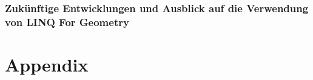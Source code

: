\documentclass[pagesize, paper=a4, fontsize=12pt,titlepage=true, headings=small, headnosepline, abstractoff, liststotoc, nochapterprefix, plainheadsepline]{scrreprt}
\newcommand{\LFG}{LINQ For Geometry}
\begin{document}
	\section {Zukünftige Entwicklungen und Ausblick auf die Verwendung von \LFG}



\part*{Appendix}
\lstlistoflistings
\newpage


\newpage
\end{document}
